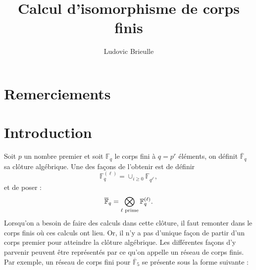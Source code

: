 \documentclass[a4paper]{article} %
\numberwithin{section}{part}
\numberwithin{equation}{section}
\newcommand\GF[1]{\mathbb{F}_{#1}}
\begin{document}
\title{Calcul d'isomorphisme de corps finis}
\author{Ludovic Brieulle}
\newtheorem{thm}{Théorème}[section]
\newtheorem{lem}[thm]{Lemme}
\newtheorem{cor}[thm]{Corollaire}
\newtheorem{prop}[thm]{Proposition}
\theoremstyle{definition}
\newtheorem{defn}[thm]{Définition}
\newtheorem*{ex}{Exemple}
\theoremstyle{remark}
\newtheorem*{rem}{Remarque}

\maketitle
\part*{Remerciements}

\part*{Introduction}
Soit $p$ un nombre premier et soit $\GF{q}$ le corps fini à $q = p^r$ éléments, 
on définit $\overline{\mathbb{F}}_q$ sa clôture algébrique. Une des façons
de l'obtenir est de définir 
\[\GF{q}^{(\ell)} = \cup_{i\geq0}{\GF{q^{\ell^i}}},\] 
et de poser :
\[\overline{\mathbb{F}}_q = \bigotimes_{\ell\textup{ prime}}{\GF{q}^{(\ell)}}.\]
Lorsqu'on a besoin de faire des calculs dans cette clôture, il faut remonter
dans le corps finis où ces calculs ont lieu. Or, il n'y a pas d'unique façon de
partir d'un corps premier pour \og atteindre\fg{} la clôture algébrique. Les
différentes façons d'y parvenir peuvent être représentés par ce qu'on appelle 
un réseau de corps finis. Par exemple, un réseau de corps fini pour 
$\overline{\mathbb{F}}_5$ se présente sous la forme suivante :

\begin{center}
\end{center}
\end{document}
